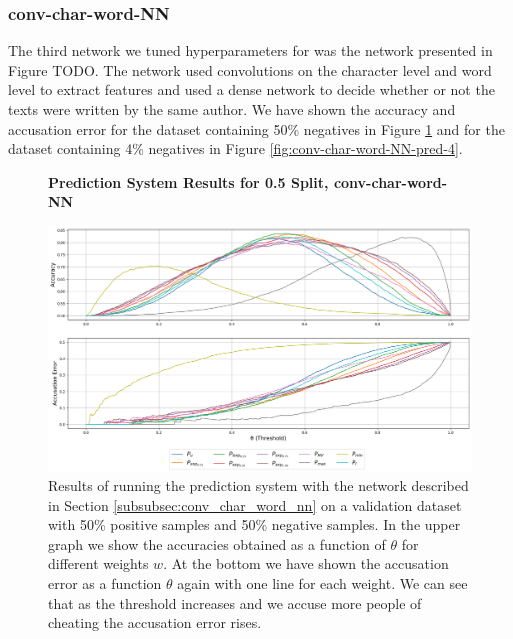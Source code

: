 \subsubsection{\glsdesc{conv-char-word-NN}}

The third network we tuned hyperparameters for was the network presented
in Figure TODO. The network used convolutions on the character level and
word level to extract features and used a dense network to decide whether or
not the texts were written by the same author. We have shown the accuracy
and accusation error for the dataset containing 50\% negatives in Figure
\ref{fig:conv-char-word-NN-pred-50} and for the dataset containing 4\%
negatives in Figure \ref{fig:conv-char-word-NN-pred-4}.

\begin{figure}
    \centering
    \textbf{Prediction System Results for 0.5 Split, \glsdesc{conv-char-word-NN}}\par\medskip
    \includegraphics[scale=0.33]{./pictures/experiments/conv_char_word_nn/prediction_system_50.png}
    \caption{Results of running the prediction system with the network described
        in Section \ref{subsubsec:conv_char_word_nn} on a validation dataset
        with 50\% positive samples and 50\% negative samples. In the upper graph
        we show the accuracies obtained as a function of $\theta$ for different
        weights $w$. At the bottom we have shown the accusation error as a
        function $\theta$ again with one line for each weight. We can see that
        as the threshold increases and we accuse more people of cheating the
        accusation error rises.}
    \label{fig:conv-char-word-NN-pred-50}
\end{figure}

